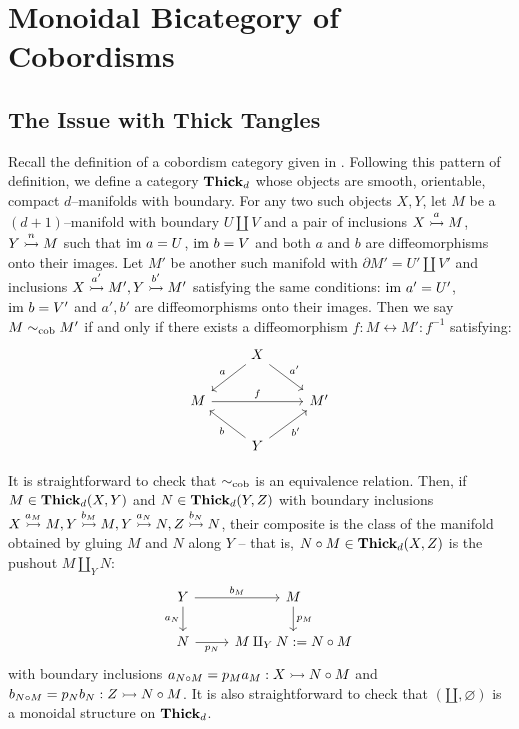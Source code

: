 \documentclass[./Thick_TQFTs_and_Quantum_Information.tex]{subfiles}
\begin{document}
\section{Monoidal Bicategory of Cobordisms}

\subsection{The Issue with Thick Tangles}

Recall the definition of a cobordism category given in \cite{Mahmud2021}.
Following this pattern of definition, we define a category $\Thick_d$ whose
objects are smooth, orientable, compact $d$--manifolds with boundary. For any
two such objects $X, Y$, let $M$ be a $(d + 1)$--manifold with boundary $U
\amalg V$ and a pair of inclusions $X \monic[a] M$, $Y \monic[n] M$ such that
$\im a = U$, $\im b = V$ and both $a$ and $b$ are diffeomorphisms onto their
images. Let $M'$ be another such manifold with $\partial M' = U' \amalg V'$ and
inclusions $X \monic[a'] M', Y \monic[b'] M'$ satisfying the same conditions:
$\im a' = U'$, $\im b = V'$ and $a', b'$ are diffeomorphisms onto their images.
Then we say $M \eqcob M'$ if and only if there exists a diffeomorphism
$f : M \longleftrightarrow M' : f^{-1}$ satisfying:
\begin{equation}\label{diag:eqcob}
  \begin{tikzcd}
    & X \arrow[dl, "a" above left] \arrow[dr, "a'" above right] & \\
    M \arrow[rr, "f" above] &
    & M' \\
    & Y \arrow[ul, "b" below left] \arrow[ur, "b'" below right] &
  \end{tikzcd}
\end{equation}

It is straightforward to check that $\eqcob$ is an equivalence relation. Then,
if $M \in \Thick_d(X, Y)$ and $N \in \Thick_d(Y, Z)$ with boundary inclusions
$X \monic[a_M] M, Y \monic[b_M] M, Y \monic[a_N] N, Z \monic[b_N] N$, their
composite is the class of the manifold obtained by gluing $M$ and $N$ along $Y$
-- that is, $N \circ M \in \Thick_d(X, Z)$ is the pushout $M \amalg_Y N$:
\begin{equation}\label{diag:gluingdef}
  \begin{tikzcd}
    Y \arrow[r, "b_M" above] \arrow[d, "a_N" left] & M \arrow[d, "p_M" right] \\
    N \arrow[r, "p_N" below] & M \amalg_Y N := N \circ M
  \end{tikzcd}
\end{equation}
with boundary inclusions
$a_{N \circ M} = p_Ma_M : X \monic N \circ M$ and
$b_{N \circ M} = p_Nb_N : Z \monic N \circ M$. It is also straightforward to
check that $(\amalg, \varnothing)$ is a monoidal structure on $\Thick_d$.
\end{document}
